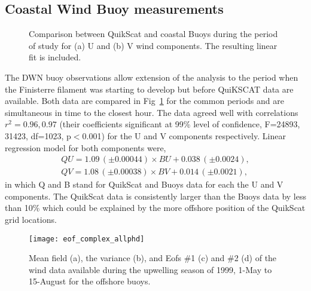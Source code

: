 \subsection{Coastal Wind Buoy measurements}
\begin{figure}
\centering {}
\caption{Comparison between QuikScat and coastal Buoys during the
period of study for (a) U and (b) V wind components. The resulting
linear fit is included.}\label{fig:windsbuoycal}
\end{figure}

The DWN buoy observations allow extension of the analysis to the
period when the Finisterre filament was starting to develop but
before QuiKSCAT data are available. Both data are compared in
Fig~\ref{fig:windsbuoycal} for the common periods and are
simultaneous in time to the closest hour. The data agreed well
with correlations $r^2=0.96,0.97$ (their coefficients significant
at 99\% level of confidence, F=24893, 31423, df=1023, p$<$0.001)
for the U and V components respectively. Linear regression model
for both components were,
\begin{eqnarray}
  QU = 1.09\,(\pm 0.00044)\times BU + 0.038\,(\pm 0.0024),\label{eq:BcorrU} \\
  QV = 1.08\,(\pm 0.00038)\times BV + 0.014 \,(\pm 0.0021),\label{eq:BcorrV}
\end{eqnarray}
in which Q and B stand for QuikScat and Buoys data for each the U
and V components. The QuikScat data is consistently larger than
the Buoys data by less than 10\% which could be explained by the
more offshore position of the QuikScat grid locations.
\begin{figure}
\centering
\texttt{[image: eof\_complex\_allphd]}
\caption{Mean field (a), the variance (b), and Eofs \#1 (c) and
\#2 (d) of the wind data available during the upwelling season of
1999, 1-May to 15-August for the offshore
buoys.}\label{fig:windsmeanvarbuoys}
\end{figure}

